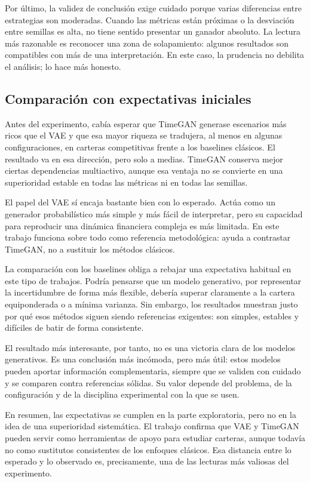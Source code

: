 \documentclass[11pt,a4paper,spanish,oneside]{book}
\numberwithin{equation}{chapter}
\numberwithin{figure}{chapter}
\begin{document}
Por último, la validez de conclusión exige cuidado porque varias diferencias entre estrategias son moderadas. Cuando las métricas están próximas o la desviación entre semillas es alta, no tiene sentido presentar un ganador absoluto. La lectura más razonable es reconocer una zona de solapamiento: algunos resultados son compatibles con más de una interpretación. En este caso, la prudencia no debilita el análisis; lo hace más honesto.

\subsection{Comparación con expectativas iniciales}

Antes del experimento, cabía esperar que TimeGAN generase escenarios más ricos que el VAE y que esa mayor riqueza se tradujera, al menos en algunas configuraciones, en carteras competitivas frente a los baselines clásicos. El resultado va en esa dirección, pero solo a medias. TimeGAN conserva mejor ciertas dependencias multiactivo, aunque esa ventaja no se convierte en una superioridad estable en todas las métricas ni en todas las semillas.

El papel del VAE sí encaja bastante bien con lo esperado. Actúa como un generador probabilístico más simple y más fácil de interpretar, pero su capacidad para reproducir una dinámica financiera compleja es más limitada. En este trabajo funciona sobre todo como referencia metodológica: ayuda a contrastar TimeGAN, no a sustituir los métodos clásicos.

La comparación con los baselines obliga a rebajar una expectativa habitual en este tipo de trabajos. Podría pensarse que un modelo generativo, por representar la incertidumbre de forma más flexible, debería superar claramente a la cartera equiponderada o a mínima varianza. Sin embargo, los resultados muestran justo por qué esos métodos siguen siendo referencias exigentes: son simples, estables y difíciles de batir de forma consistente.

El resultado más interesante, por tanto, no es una victoria clara de los modelos generativos. Es una conclusión más incómoda, pero más útil: estos modelos pueden aportar información complementaria, siempre que se validen con cuidado y se comparen contra referencias sólidas. Su valor depende del problema, de la configuración y de la disciplina experimental con la que se usen.

En resumen, las expectativas se cumplen en la parte exploratoria, pero no en la idea de una superioridad sistemática. El trabajo confirma que VAE y TimeGAN pueden servir como herramientas de apoyo para estudiar carteras, aunque todavía no como sustitutos consistentes de los enfoques clásicos. Esa distancia entre lo esperado y lo observado es, precisamente, una de las lecturas más valiosas del experimento.
\end{document}
